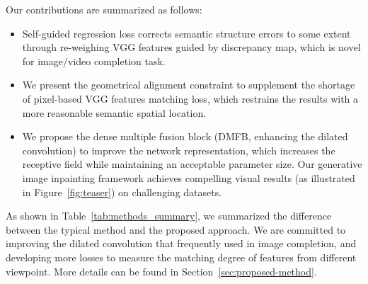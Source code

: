 \documentclass[journal]{IEEEtran}
\begin{document}
\begin{table*}[htpb]
	\centering
	\caption{Image inpainting methodology employed by some representative models.}
	\label{tab:methods_summary}
\end{table*}


Our contributions are summarized as follows:
\begin{itemize}
	
	\item Self-guided regression loss corrects semantic structure errors to some extent through re-weighing VGG features guided by discrepancy map, which is novel for image/video completion task.
	
	\item We present the geometrical alignment constraint to supplement the shortage of pixel-based VGG features matching loss, which restrains the results with a more reasonable semantic spatial location.
	
	\item We propose the dense multiple fusion block (DMFB, enhancing the dilated convolution) to improve the network representation, which increases the receptive field while maintaining an acceptable parameter size. Our generative image inpainting framework achieves compelling visual results (as illustrated in Figure~\ref{fig:teaser}) on challenging datasets.
\end{itemize}
As shown in Table~\ref{tab:methods_summary}, we summarized the difference between the typical method and the proposed approach. We are committed to improving the dilated convolution that frequently used in image completion, and developing more losses to measure the matching degree of features from different viewpoint. More details can be found in Section~\ref{sec:proposed-method}.
\end{document}
